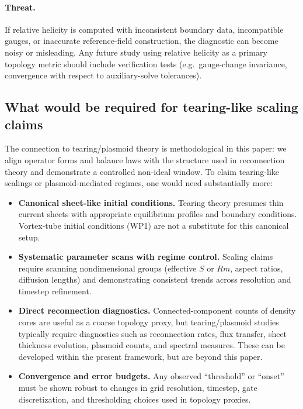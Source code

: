 \documentclass[11pt]{article}
\theoremstyle{plain}
\theoremstyle{definition}
\theoremstyle{remark}
\begin{document}
\paragraph{Threat.}
If relative helicity is computed with inconsistent boundary data, incompatible gauges, or inaccurate
reference-field construction, the diagnostic can become noisy or misleading. Any future study using
relative helicity as a primary topology metric should include verification tests (e.g.\ gauge-change
invariance, convergence with respect to auxiliary-solve tolerances).

\subsection{What would be required for tearing-like scaling claims}\label{sec:limitations_scaling}
The connection to tearing/plasmoid theory is methodological in this paper: we align operator forms and
balance laws with the structure used in reconnection theory and demonstrate a controlled non-ideal
window. To claim tearing-like scalings or plasmoid-mediated regimes, one would need substantially more:

\begin{itemize}[leftmargin=*]
  \item \textbf{Canonical sheet-like initial conditions.}
  Tearing theory presumes thin current sheets with appropriate equilibrium profiles and boundary
  conditions. Vortex-tube initial conditions (WP1) are not a substitute for this canonical setup.

  \item \textbf{Systematic parameter scans with regime control.}
  Scaling claims require scanning nondimensional groups (effective $S$ or $Rm$, aspect ratios,
  diffusion lengths) and demonstrating consistent trends across resolution and timestep refinement.

  \item \textbf{Direct reconnection diagnostics.}
  Connected-component counts of density cores are useful as a coarse topology proxy, but tearing/plasmoid
  studies typically require diagnostics such as reconnection rates, flux transfer, sheet thickness
  evolution, plasmoid counts, and spectral measures. These can be developed within the present framework,
  but are beyond this paper.

  \item \textbf{Convergence and error budgets.}
  Any observed ``threshold'' or ``onset'' must be shown robust to changes in grid resolution, timestep,
  gate discretization, and thresholding choices used in topology proxies.
\end{itemize}
\end{document}
